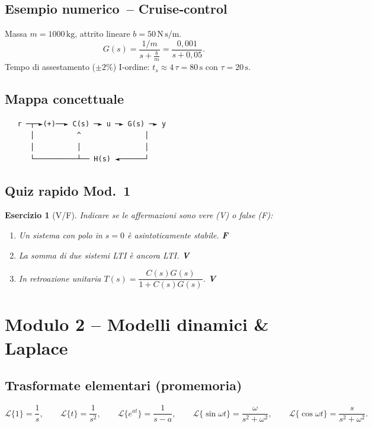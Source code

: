 \documentclass[a4paper,11pt]{article}
\newtheorem{exercise}{Esercizio}[section]
\begin{document}
\subsection*{Esempio numerico – Cruise‑control}
Massa $m=1000\,\mathrm{kg}$, attrito lineare $b=50\,\mathrm{N\,s/m}$.
\[
G(s)=\frac{1/m}{s+\tfrac{b}{m}}=\frac{0{,}001}{s+0{,}05}.
\]
Tempo di assestamento ($\pm2\%$) I‑ordine: $t_s\approx4\,\tau=80\,\mathrm{s}$ con $\tau=20\,\mathrm{s}$.

\subsection*{Mappa concettuale}
\begin{center}\small
\begin{verbatim}
   r ─┬─►(+)──► C(s) ─► u ─► G(s) ─► y
      │          ^               │
      │          │               │
      └──────────┴── H(s) ◄──────┘
\end{verbatim}
\end{center}

\subsection*{Quiz rapido Mod. 1}
\begin{exercise}[V/F]
Indicare se le affermazioni sono vere (V) o false (F):
\begin{enumerate}
  \item Un sistema con polo in $s=0$ è asintoticamente stabile. \hfill\textbf{F}
  \item La somma di due sistemi LTI è ancora LTI. \hfill\textbf{V}
  \item In retroazione unitaria $T(s)=\dfrac{C(s)G(s)}{1+C(s)G(s)}$. \hfill\textbf{V}
\end{enumerate}
\end{exercise}

\section{Modulo 2 – Modelli dinamici \& Laplace}
\subsection*{Trasformate elementari (promemoria)}
\[
\mathcal{L}\{1\} = \frac{1}{s},\qquad
\mathcal{L}\{t\} = \frac{1}{s^{2}},\qquad
\mathcal{L}\{e^{at}\} = \frac{1}{s-a},\qquad
\mathcal{L}\{\sin \omega t\} = \frac{\omega}{s^{2}+\omega^{2}},\qquad
\mathcal{L}\{\cos \omega t\} = \frac{s}{s^{2}+\omega^{2}}.
\]
\end{document}
